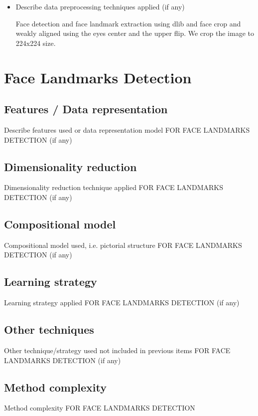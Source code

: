 \documentclass{article}
\begin{document}
\begin{itemize}
[4] J. Guo et al., ‘‘Multi-modality network with visual and geometrical information for micro emotion recognition,’’ in Proc. 12th IEEE Int. Conf. Autom. Face Gesture Recognit. (FG), May/Jun. 2017, pp. 814-819.

\item Describe data preprocessing techniques applied (if any)

Face detection and face landmark extraction using dlib and face crop and weakly aligned using the eyes center and the upper flip. We crop the image to 224x224 size.

\end{itemize}


\section{Face Landmarks Detection}
\subsection{Features / Data representation}
Describe features used or data representation model FOR FACE LANDMARKS DETECTION (if any)

\subsection{Dimensionality reduction}
Dimensionality reduction technique applied FOR FACE LANDMARKS DETECTION (if any)

\subsection{Compositional model}
Compositional model used, i.e. pictorial structure FOR FACE LANDMARKS DETECTION (if any)

\subsection{Learning strategy}
Learning strategy applied FOR FACE LANDMARKS DETECTION (if any)

\subsection{Other techniques}
Other technique/strategy used not included in previous items FOR FACE LANDMARKS DETECTION (if any)

\subsection{Method complexity}
Method complexity FOR FACE LANDMARKS DETECTION
\end{document}
